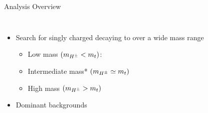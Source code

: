 \documentclass[aspectratio=169,xcolor=table]{beamer}
\begin{document}


\section{\HpmLong }
  
  \begin{frame}[t]{Analysis Overview}
      \begin{columns}[t]

            \vspace{-20mm}
            \begin{itemize}
              \item Search for singly charged \Hpm decaying to \taunu over a wide mass range
                \begin{itemize}
                  \item Low mass $ (m_{H^{\pm}} < m_{t})$:
                  \item Intermediate mass*  $(m_{H^{\pm}} \simeq m_{t})$
                  \item High mass $(m_{H^{\pm}} > m_{t})$
                \end{itemize}
              \item Dominant backgrounds
              \vspace{-3mm}
            \begin{table}
              \tiny
\end{table}
\end{itemize}
\end{columns}
\end{frame}
\end{document}
